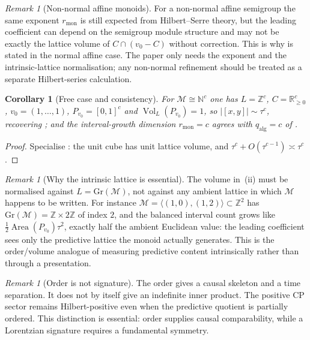 \documentclass[11pt]{article}
\newtheorem{corollary}[theorem]{Corollary}
\theoremstyle{definition}
\theoremstyle{remark}
\newtheorem{remark}[theorem]{Remark}
\newcommand{\N}{\mathbb{N}}
\newcommand{\Z}{\mathbb{Z}}
\newcommand{\R}{\mathbb{R}}
\newcommand{\M}{\mathcal{M}}
\newcommand{\qalg}{q_{\mathrm{alg}}}
\newcommand{\rmon}{r_{\mathrm{mon}}}
\begin{document}
\begin{remark}[Non-normal affine monoids]
\label{rem:non-normal-ehrhart}
For a non-normal affine semigroup the same exponent $\rmon$ is still expected
from Hilbert--Serre theory, but the leading coefficient can depend on the
semigroup module structure and may not be exactly the lattice volume of
$C\cap(v_0-C)$ without correction.  This is why  is
stated in the normal affine case.  The paper only needs the exponent and the
intrinsic-lattice normalisation; any non-normal refinement should be treated as
a separate Hilbert-series calculation.
\end{remark}

\begin{corollary}[Free case and consistency]
\label{cor:ehrhart-free}
For $\M\cong\N^{c}$ one has $L=\Z^{c}$, $C=\R_{\ge0}^{c}$,
$v_0=(1,\dots,1)$, $P_{v_0}=[0,1]^{c}$ and $\operatorname{Vol}_L(P_{v_0})=1$,
so $|[x,y]|\sim\tau^{c}$, recovering ; and the
interval-growth dimension $\rmon=c$ agrees with $\qalg=c$ of .
\end{corollary}

\begin{proof}
Specialise : the unit cube has unit lattice volume, and
$\tau^{c}+O(\tau^{c-1})\asymp\tau^{c}$.
\end{proof}

\begin{remark}[Why the intrinsic lattice is essential]
\label{rem:intrinsic-lattice}
The volume in \,(ii) must be normalised against
$L=\mathrm{Gr}(\M)$, not against any ambient lattice in which $\M$ happens to be
written.  For instance $\M=\langle(1,0),(1,2)\rangle\subset\Z^2$ has
$\mathrm{Gr}(\M)=\Z\times2\Z$ of index $2$, and the balanced interval count grows
like $\tfrac12\operatorname{Area}(P_{v_0})\tau^{2}$, exactly half the ambient
Euclidean value: the leading coefficient sees only the predictive lattice the
monoid actually generates.  This is the order/volume analogue of measuring
predictive content intrinsically rather than through a presentation.
\end{remark}



\begin{remark}[Order is not signature]
\label{rem:order-not-signature}
The order gives a causal skeleton and a time separation.  It does not by itself give an indefinite inner product.  The positive CP sector remains Hilbert-positive even when the predictive quotient is partially ordered.  This distinction is essential: order supplies causal comparability, while a Lorentzian signature requires a fundamental symmetry.
\end{remark}
\end{document}
